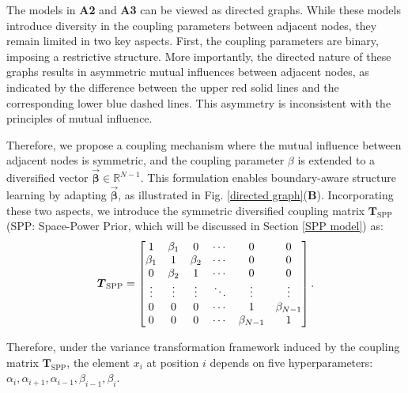 \documentclass[lettersize,journal]{IEEEtran}
\theoremstyle{remark}
\begin{document}
The models in \textbf{A2} and \textbf{A3} can be viewed as directed graphs. While these models introduce diversity in the coupling parameters between adjacent nodes, they remain limited in two key aspects. First, the coupling parameters are binary, imposing a restrictive structure. More importantly, the directed nature of these graphs results in asymmetric mutual influences between adjacent nodes, as indicated by the difference between the upper red solid lines and the corresponding lower blue dashed lines. This asymmetry is inconsistent with the principles of mutual influence.

Therefore, we propose a coupling mechanism where the mutual influence between adjacent nodes is symmetric, and the coupling parameter \( \beta \) is extended to a diversified vector \( 
\vec{\boldsymbol{\beta}}\in \mathbb{R}^{N-1} \). This formulation enables boundary-aware structure learning by adapting $\vec{\boldsymbol{\beta}}$, as illustrated in Fig.  \ref{directed graph}(\textbf{B}). Incorporating these two aspects, we introduce the symmetric diversified coupling matrix \( \boldsymbol{T}_{\text{SPP}} \) (SPP: Space-Power Prior, which will be discussed in Section \ref{SPP model}) as: 
	\begin{equation}   
		\boldsymbol{T}_{\rm SPP} =
		\begin{bmatrix}
			1     & \beta_1 & 0     & \cdots     &0& 0     \\
			\beta_1 & 1     & \beta_2 & \cdots    &0 & 0     \\
			0     & \beta_2 & 1     & \cdots  &0   & 0     \\
			\vdots& \vdots& \vdots& \ddots &\vdots& \vdots\\
			0     & 0     & 0     & \cdots  &1&\beta_{N-1} \\
			0     & 0     & 0     & \cdots &\beta_{N-1}  & 1     \\
		\end{bmatrix}.
	\end{equation}

Therefore, under the variance transformation framework induced by the coupling matrix \( \boldsymbol{T}_{\text{SPP}} \), the element \( x_i \) at position \( i \) depends on five hyperparameters: \( \alpha_i, \alpha_{i+1}, \alpha_{i-1}, \beta_{i-1}, \beta_i \).

\vspace{2mm}
\end{document}
